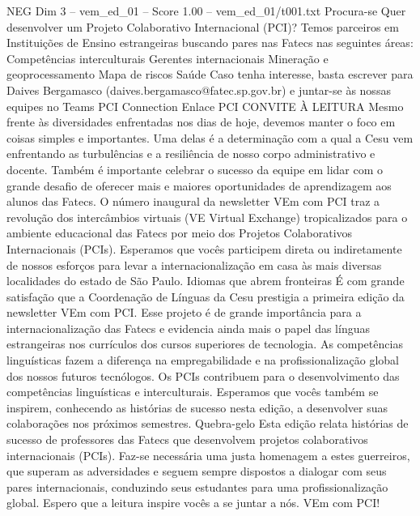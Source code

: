 \begin{textsample}{NEG Dim 3 – vem\_ed\_01 – Score 1.00 – vem\_ed\_01/t001.txt}  \label{ex:f3_neg_093}
Procura-se Quer desenvolver um Projeto Colaborativo Internacional (PCI)?
Temos parceiros em Instituições de Ensino estrangeiras buscando pares nas Fatecs nas seguintes áreas: Competências interculturais Gerentes internacionais Mineração e geoprocessamento Mapa de riscos Saúde Caso tenha interesse, basta escrever para Daives Bergamasco (daives.bergamasco@fatec.sp.gov.br) e juntar-se às nossas equipes no Teams PCI Connection Enlace PCI CONVITE À LEITURA Mesmo frente às diversidades enfrentadas nos dias de hoje, devemos manter o foco em coisas simples e importantes.
Uma delas é a determinação com a qual a Cesu vem enfrentando as turbulências e a resiliência de nosso corpo administrativo e docente.
Também é importante celebrar o sucesso da equipe em lidar com o grande desafio de oferecer mais e maiores oportunidades de aprendizagem aos alunos das Fatecs.
O número inaugural da newsletter VEm com PCI traz a revolução dos intercâmbios virtuais (VE Virtual Exchange) tropicalizados para o ambiente educacional das Fatecs por meio dos Projetos Colaborativos Internacionais (PCIs).
Esperamos que vocês participem direta ou indiretamente de nossos esforços para levar a internacionalização em casa às mais diversas localidades do estado de São Paulo.
Idiomas que abrem fronteiras É com grande satisfação que a Coordenação de Línguas da Cesu prestigia a primeira edição da newsletter VEm com PCI.
Esse projeto é de grande importância para a internacionalização das Fatecs e evidencia ainda mais o papel das línguas estrangeiras nos currículos dos cursos superiores de tecnologia.
As competências linguísticas fazem a diferença na empregabilidade e na profissionalização global dos nossos futuros tecnólogos.
Os PCIs contribuem para o desenvolvimento das competências linguísticas e interculturais.
Esperamos que vocês também se inspirem, conhecendo as histórias de sucesso nesta edição, a desenvolver suas colaborações nos próximos semestres.
Quebra-gelo Esta edição relata histórias de sucesso de professores das Fatecs que desenvolvem projetos colaborativos internacionais (PCIs).
Faz-se necessária uma justa homenagem a estes guerreiros, que superam as adversidades e seguem sempre dispostos a dialogar com seus pares internacionais, conduzindo seus estudantes para uma profissionalização global.
Espero que a leitura inspire vocês a se juntar a nós.
VEm com PCI!

\end{textsample}
